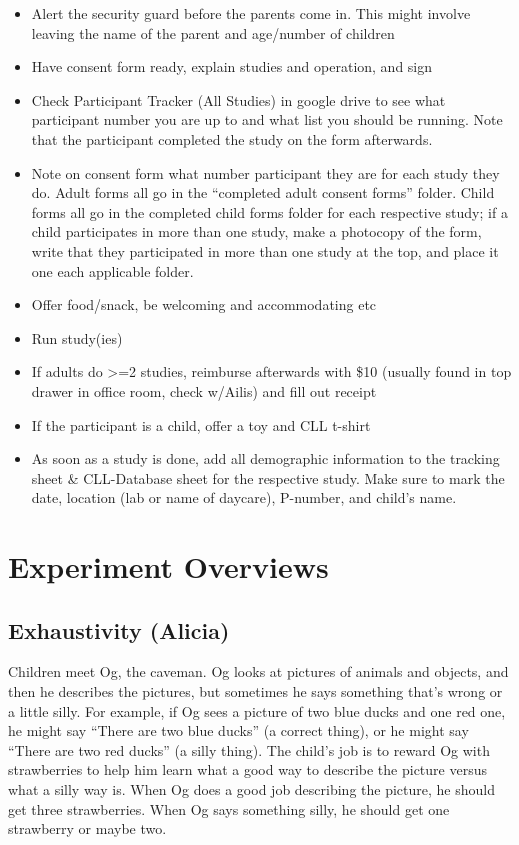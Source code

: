 \documentclass[
]{book}
\providecommand{\tightlist}{%
  \setlength{\itemsep}{0pt}\setlength{\parskip}{0pt}}
\begin{document}
\begin{itemize}
\tightlist
\item
  Alert the security guard before the parents come in. This might involve leaving the name of the parent and age/number of children
\item
  Have consent form ready, explain studies and operation, and sign
\item
  Check Participant Tracker (All Studies) in google drive to see what participant number you are up to and what list you should be running. Note that the participant completed the study on the form afterwards.
\item
  Note on consent form what number participant they are for each study they do. Adult forms all go in the ``completed adult consent forms'' folder. Child forms all go in the completed child forms folder for each respective study; if a child participates in more than one study, make a photocopy of the form, write that they participated in more than one study at the top, and place it one each applicable folder.
\item
  Offer food/snack, be welcoming and accommodating etc
\item
  Run study(ies)
\item
  If adults do \textgreater=2 studies, reimburse afterwards with \$10 (usually found in top drawer in office room, check w/Ailis) and fill out receipt
\item
  If the participant is a child, offer a toy and CLL t-shirt
\item
  As soon as a study is done, add all demographic information to the tracking sheet \& CLL-Database sheet for the respective study. Make sure to mark the date, location (lab or name of daycare), P-number, and child's name.
\end{itemize}

\hypertarget{expov}{%
\section{Experiment Overviews}\label{expov}}

\hypertarget{exhaustivity-alicia}{%
\subsection*{Exhaustivity (Alicia)}\label{exhaustivity-alicia}}

Children meet Og, the caveman. Og looks at pictures of animals and objects, and then he describes the pictures, but sometimes he says something that's wrong or a little silly. For example, if Og sees a picture of two blue ducks and one red one, he might say ``There are two blue ducks'' (a correct thing), or he might say ``There are two red ducks'' (a silly thing). The child's job is to reward Og with strawberries to help him learn what a good way to describe the picture versus what a silly way is. When Og does a good job describing the picture, he should get three strawberries. When Og says something silly, he should get one strawberry or maybe two.
\end{document}
